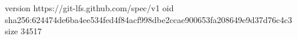 version https://git-lfs.github.com/spec/v1
oid sha256:624474de6ba4ee534fed4f84acf998dbe2ccae900653fa208649e9d37d76c4c3
size 34517
